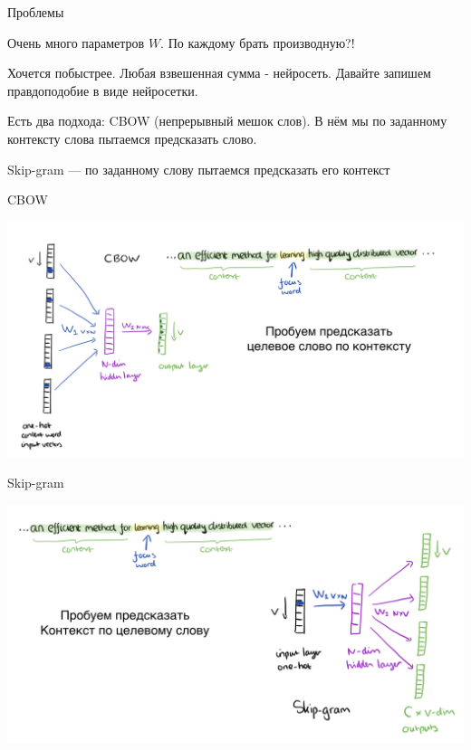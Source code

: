 \documentclass[notes,12pt, aspectratio=169]{beamer}
\newenvironment{wideitemize}{\itemize\addtolength{\itemsep}{10pt}}{\enditemize}
\begin{document}
\begin{frame}{Проблемы}
\begin{wideitemize} 
\item Очень много параметров $W$. По каждому брать производную?! 

\item Хочется побыстрее. Любая взвешенная сумма - нейросеть. Давайте запишем правдоподобие в виде нейросетки.

\item \alert{Есть два подхода:}  CBOW (непрерывный мешок слов). В нём мы по заданному контексту слова пытаемся предсказать слово.

\item Skip-gram — по заданному слову пытаемся предсказать его контекст 
\end{wideitemize} 
\end{frame} 


\begin{frame}{CBOW}
\begin{center}
\includegraphics[width=.95\linewidth]{CBOW.png}
\end{center}
\end{frame} 


\begin{frame}{Skip-gram}
\begin{center}
\includegraphics[width=.95\linewidth]{skipgram.png}
\end{center}
\end{frame} 
\end{document}
